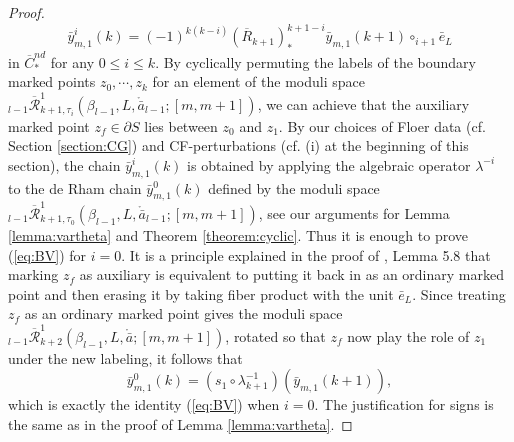 \documentclass[a4paper]{article}
\numberwithin{equation}{section}
\begin{document}
\begin{proof}
\begin{equation}\label{eq:BV}
\bar{y}_{m,1}^i(k)=(-1)^{k(k-i)}(\overline{R}_{k+1})_\ast^{k+1-i}\bar{y}_{m,1}(k+1)\circ_{i+1}\bar{e}_L
\end{equation}
in $\overline{C}_\ast^\mathit{nd}$ for any $0\leq i\leq k$. By cyclically permuting the labels of the boundary marked points $z_0,\cdots,z_k$ for an element of the moduli space ${}_{l-1}\overline{\mathcal{R}}_{k+1,\tau_i}^1(\beta_{l-1},L,\ring{\bar{a}}_{l-1};[m,m+1])$, we can achieve that the auxiliary marked point $z_f\in\partial S$ lies between $z_0$ and $z_1$. By our choices of Floer data (cf. Section \ref{section:CG}) and CF-perturbations (cf. (i) at the beginning of this section), the chain $\bar{y}_{m,1}^i(k)$ is obtained by applying the algebraic operator $\lambda^{-i}$ to the de Rham chain $\bar{y}_{m,1}^0(k)$ defined by the moduli space ${}_{l-1}\overline{\mathcal{R}}_{k+1,\tau_0}^1(\beta_{l-1},L,\ring{\bar{a}}_{l-1};[m,m+1])$, see our arguments for Lemma \ref{lemma:vartheta} and Theorem \ref{theorem:cyclic}. Thus it is enough to prove (\ref{eq:BV}) for $i=0$. It is a principle explained in the proof of \cite{sg1}, Lemma 5.8 that marking $z_f$ as auxiliary is equivalent to putting it back in as an ordinary marked point and then erasing it by taking fiber product with the unit $\bar{e}_L$. Since treating $z_f$ as an ordinary marked point gives the moduli space ${}_{l-1}\overline{\mathcal{R}}_{k+2}^1(\beta_{l-1},L,\ring{\bar{a}};[m,m+1])$, rotated so that $z_f$ now play the role of $z_1$ under the new labeling, it follows that
\begin{equation}
\bar{y}_{m,1}^0(k)=(s_1\circ\lambda^{-1}_{k+1})\left(\bar{y}_{m,1}(k+1)\right),
\end{equation}
which is exactly the identity (\ref{eq:BV}) when $i=0$. The justification for signs is the same as in the proof of Lemma \ref{lemma:vartheta}.
\end{proof}
\end{document}
